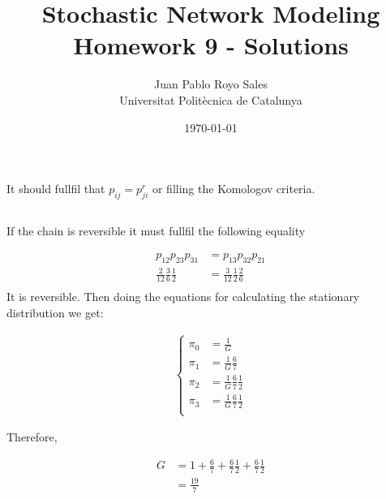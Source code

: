 \documentclass[12pt, a4paper]{article}
\title{%
  Stochastic Network Modeling \\
  Homework 9 - Solutions
}
\author{%
  Juan Pablo Royo Sales\\
  \small{Universitat Politècnica de Catalunya}
}
\date\today
\begin{document}
\maketitle

\section{}
\subsection{}
It should fullfil that $p_{ij} = p_{ji}^r$ or filling the Komologov criteria.

\subsection{}
If the chain is reversible it must fullfil the following equality

\begin{subequations}
  \begin{align}
    p_{12}p_{23}p_{31} &= p_{13}p_{32}p_{21}\\
    \frac{2}{12}\frac{3}{6}\frac{1}{2} &= \frac{3}{12}\frac{1}{2}\frac{2}{6}\\
  \end{align}
\end{subequations}
It is reversible. Then doing the equations for calculating the stationary distribution we get:

\begin{subequations}
  \begin{align}
    \begin{cases}
      \pi_{0} &= \frac{1}{G}\\
      \pi_{1} &= \frac{1}{G} \frac{6}{7}\\
      \pi_{2} &= \frac{1}{G} \frac{6}{7} \frac{1}{2}\\
      \pi_{3} &= \frac{1}{G} \frac{6}{7} \frac{1}{2}\\
    \end{cases}
  \end{align}
\end{subequations}

Therefore,

\begin{subequations}
  \begin{align}
      G &= 1 + \frac{6}{7} + \frac{6}{7} \frac{1}{2} + \frac{6}{7} \frac{1}{2}\\
        &= \frac{19}{7}
  \end{align}
\end{subequations}
\end{document}
